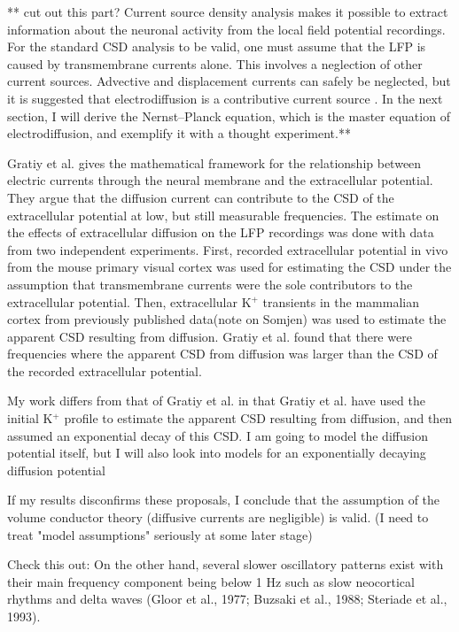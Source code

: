 \documentclass{uiophd}
\begin{document}
** cut out this part?
Current source density analysis makes it possible to extract information about the neuronal activity from the local field potential recordings. For the standard CSD analysis to be valid, one must assume that the LFP is caused by transmembrane currents alone. This involves a neglection of other current sources. Advective and displacement currents can safely be neglected, but it is suggested that electrodiffusion is a contributive current source \cite{Gratiy2017}. In the next section, I will derive the Nernst--Planck equation, which is the master equation of electrodiffusion, and exemplify it with a thought experiment.**

Gratiy et al.\cite{Gratiy2017} gives the mathematical framework for the relationship between electric currents through the neural membrane and the extracellular potential. They argue that the diffusion current can contribute to the CSD of the extracellular potential at low, but still measurable frequencies. The estimate on the effects of extracellular diffusion on the LFP recordings was done with data from two independent experiments. First, recorded extracellular potential in vivo from the mouse primary visual cortex was used for estimating the CSD under the assumption that transmembrane currents were the sole contributors to the extracellular potential. Then, extracellular K$^+$ transients in the mammalian cortex from previously published data(note on Somjen) was used to estimate the apparent CSD resulting from diffusion. Gratiy et al. found that there were frequencies where the apparent CSD from diffusion was larger than the CSD of the recorded extracellular potential.

 My work differs from that of Gratiy et al. in that Gratiy et al. have used the initial K$^+$ profile to estimate the apparent CSD resulting from diffusion, and then assumed an exponential decay of this CSD. I am going to model the diffusion potential itself, but I will also look into models for an exponentially decaying diffusion potential

If my results disconfirms these proposals, I conclude that the assumption of the volume conductor theory (diffusive currents are negligible) is valid. 
(I need to treat "model assumptions" seriously at some later stage)

Check this out: On the
other hand, several slower oscillatory patterns exist with their main
frequency component being below 1 Hz such as slow neocortical
rhythms and delta waves (Gloor et al., 1977; Buzsaki et al., 1988;
Steriade et al., 1993).
\end{document}
